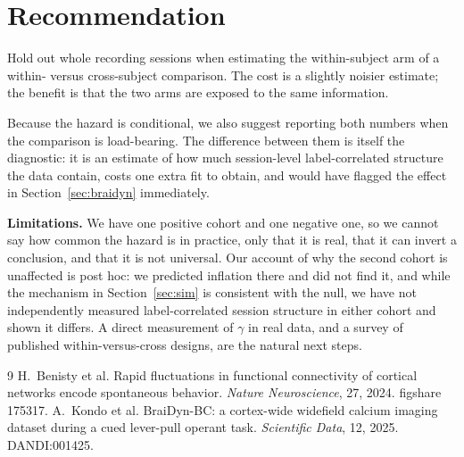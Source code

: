 \documentclass{article}
\begin{document}
\section{Recommendation}
Hold out whole recording sessions when estimating the within-subject arm of a within- versus
cross-subject comparison. The cost is a slightly noisier estimate; the benefit is that the two arms
are exposed to the same information.

Because the hazard is conditional, we also suggest reporting both numbers when the comparison is
load-bearing. The difference between them is itself the diagnostic: it is an estimate of how much
session-level label-correlated structure the data contain, costs one extra fit to obtain, and would
have flagged the effect in Section~\ref{sec:braidyn} immediately.

\textbf{Limitations.} We have one positive cohort and one negative one, so we cannot say how common
the hazard is in practice, only that it is real, that it can invert a conclusion, and that it is not
universal. Our account of why the second cohort is unaffected is post hoc: we predicted inflation
there and did not find it, and while the mechanism in Section~\ref{sec:sim} is consistent with the
null, we have not independently measured label-correlated session structure in either cohort and
shown it differs. A direct measurement of $\gamma$ in real data, and a survey of published
within-versus-cross designs, are the natural next steps.

{\small

\begin{thebibliography}{9}
 H.~Benisty et al. Rapid fluctuations in functional
connectivity of cortical networks encode spontaneous behavior. \emph{Nature Neuroscience}, 27, 2024.
figshare 175317.
 A.~Kondo et al. BraiDyn-BC: a cortex-wide widefield calcium
imaging dataset during a cued lever-pull operant task. \emph{Scientific Data}, 12, 2025.
DANDI:001425.
\end{thebibliography}
}
\end{document}
